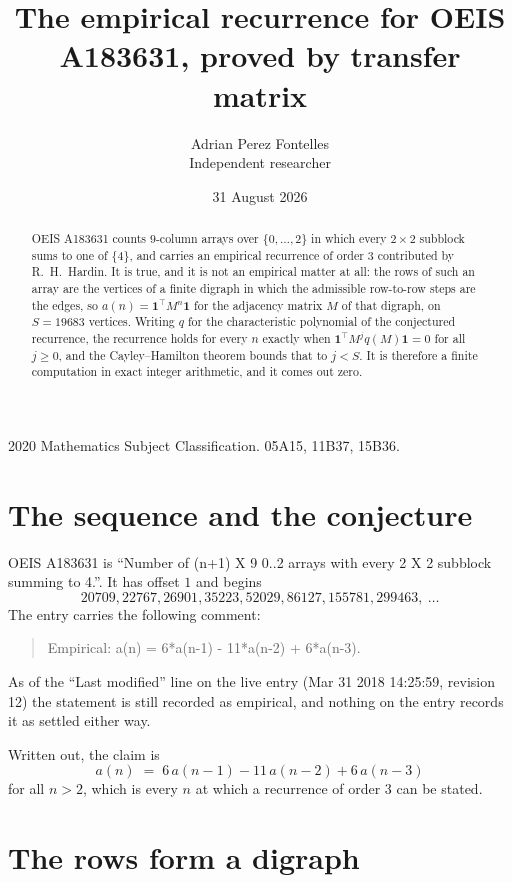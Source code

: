 \documentclass[11pt,a4paper]{article}
\title{The empirical recurrence for OEIS A183631, proved by transfer matrix}
\author{Adrian Perez Fontelles\\ \small Independent researcher}
\date{31 August 2026}
\theoremstyle{plain}
\theoremstyle{definition}
\begin{document}
\maketitle

\begin{abstract}
OEIS A183631 counts $9$-column arrays over $\{0,\dots,2\}$ in which every
$2\times2$ subblock sums to one of $\{4\}$, and carries an empirical
recurrence of order $3$ contributed by R.~H.~Hardin. It is true, and it is not an
empirical matter at all: the rows of such an array are the vertices of a finite digraph in
which the admissible row-to-row steps are the edges, so $a(n)=\mathbf{1}^{\!\top}M^{n}
\mathbf{1}$ for the adjacency matrix $M$ of that digraph, on $S=19683$ vertices. Writing
$q$ for the characteristic polynomial of the conjectured recurrence, the recurrence holds
for every $n$ exactly when $\mathbf{1}^{\!\top}M^{j}q(M)\mathbf{1}=0$ for all
$j\ge0$, and the Cayley--Hamilton theorem bounds that to $j<S$. It is therefore a finite
computation in exact integer arithmetic, and it comes out zero.
\end{abstract}

\noindent\small 2020 Mathematics Subject Classification. 05A15, 11B37, 15B36.\normalsize

\section{The sequence and the conjecture}

OEIS A183631 is ``Number of (n+1) X 9 0..2 arrays with every 2 X 2 subblock summing to 4.''. It has offset $1$
and begins
\[
20709, 22767, 26901, 35223, 52029, 86127, 155781, 299463,\ \dots
\]
The entry carries the following comment:
\begin{quote}\small
Empirical: a(n) = 6*a(n-1) - 11*a(n-2) + 6*a(n-3).
\end{quote}
As of the ``Last modified'' line on the live entry (Mar 31 2018 14:25:59, revision 12) the statement is
still recorded as empirical, and nothing on the entry records it as settled either way.

Written out, the claim is
\begin{equation}\label{eq:conj}
a(n)\;=\;6\,a(n-1) - 11\,a(n-2) + 6\,a(n-3)
\end{equation}
for all $n>2$, which is every $n$ at which a recurrence of order $3$ can be
stated.

\section{The rows form a digraph}
\end{document}
